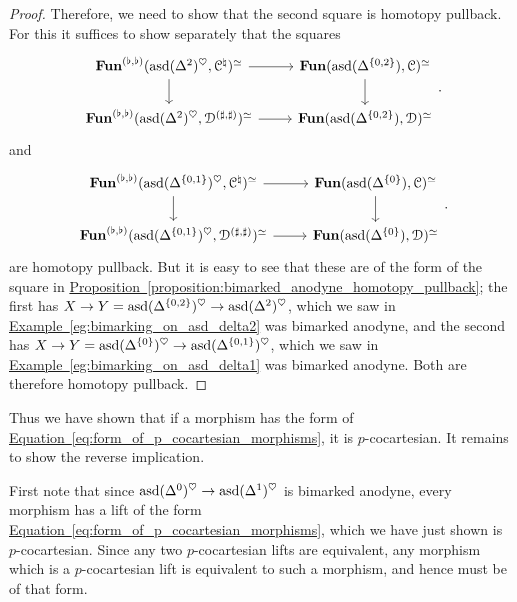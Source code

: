 \documentclass[main.tex]{subfiles}
\begin{document}
\begin{proof}
  Therefore, we need to show that the second square is homotopy pullback. For this it suffices to show separately that the squares
  \begin{equation*}
    \begin{tikzcd}
      \Fun^{(\flat, \flat)}(\asd(\Delta^{2})^{\heartsuit}, \category{C}^{\natural})^{\simeq}
      \arrow[r]
      \arrow[d]
      & \Fun(\asd(\Delta^{\{0, 2\}}), \category{C})^{\simeq}
      \arrow[d]
      \\
      \Fun^{(\flat, \flat)}(\asd(\Delta^{2})^{\heartsuit}, \category{D}^{(\sharp, \sharp)})^{\simeq}
      \arrow[r]
      & \Fun(\asd(\Delta^{\{0, 2\}}), \category{D})^{\simeq}
    \end{tikzcd}.
  \end{equation*}
  and
  \begin{equation*}
    \begin{tikzcd}
      \Fun^{(\flat, \flat)}(\asd(\Delta^{\{0, 1\}})^{\heartsuit}, \category{C}^{\natural})^{\simeq}
      \arrow[r]
      \arrow[d]
      & \Fun(\asd(\Delta^{\{0\}}), \category{C})^{\simeq}
      \arrow[d]
      \\
      \Fun^{(\flat, \flat)}(\asd(\Delta^{\{0, 1\}})^{\heartsuit}, \category{D}^{(\sharp, \sharp)})^{\simeq}
      \arrow[r]
      & \Fun(\asd(\Delta^{\{0\}}), \category{D})^{\simeq}
    \end{tikzcd}.
  \end{equation*}
  are homotopy pullback. But it is easy to see that these are of the form of the square in \hyperref[proposition:bimarked_anodyne_homotopy_pullback]{Proposition~\ref*{proposition:bimarked_anodyne_homotopy_pullback}}; the first has $X \to Y = \mathrm{asd}(\Delta^{\{0, 2\}})^{\heartsuit} \to \mathrm{asd}(\Delta^{2})^{\heartsuit}$, which we saw in \hyperref[eg:bimarking_on_asd_delta2]{Example~\ref*{eg:bimarking_on_asd_delta2}} was bimarked anodyne, and the second has $X \to Y = \mathrm{asd}(\Delta^{\{0\}})^{\heartsuit} \to \mathrm{asd}(\Delta^{\{0, 1\}})^{\heartsuit}$, which we saw in \hyperref[eg:bimarking_on_asd_delta1]{Example~\ref*{eg:bimarking_on_asd_delta1}} was bimarked anodyne. Both are therefore homotopy pullback.
\end{proof}

Thus we have shown that if a morphism has the form of \hyperref[eq:form_of_p_cocartesian_morphisms]{Equation~\ref*{eq:form_of_p_cocartesian_morphisms}}, it is $p$-cocartesian. It remains to show the reverse implication.

First note that since $\mathrm{asd}(\Delta^{0})^{\heartsuit} \to \mathrm{asd}(\Delta^{1})^{\heartsuit}$ is bimarked anodyne, every morphism has a lift of the form \hyperref[eq:form_of_p_cocartesian_morphisms]{Equation~\ref*{eq:form_of_p_cocartesian_morphisms}}, which we have just shown is $p$-cocartesian. Since any two $p$-cocartesian lifts are equivalent, any morphism which is a $p$-cocartesian lift is equivalent to such a morphism, and hence must be of that form.
\end{document}
